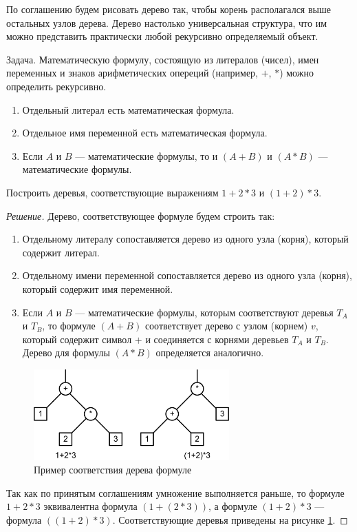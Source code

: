 По соглашению будем рисовать дерево так, чтобы корень располагался выше остальных узлов дерева. Дерево настолько универсальная структура, что им можно представить практически любой рекурсивно определяемый объект.
\begin{exampl} Задача.
    Математическую формулу, состоящую из литералов (чисел), имен переменных и знаков арифметических опереций (например, $+$, $*$) можно определить рекурсивно.
    \begin{enumerate}
        \item Отдельный литерал есть математическая формула.
        \item Отдельное имя переменной есть математическая формула.
        \item Если $A$ и $B$ --- математические формулы, то и $(A+B)$ и $(A*B)$ --- математические формулы.
    \end{enumerate}
    Построить деревья, соответствующие выражениям $1+2*3$ и $(1+2)*3$.
\end{exampl}
\begin{proof}[Решение]
    Дерево, соответствующее формуле будем строить так:
    \begin{enumerate}
        \item Отдельному литералу сопоставляется дерево из одного узла (корня), который содержит литерал.
        \item Отдельному имени переменной сопоставляется дерево из одного узла (корня), который содержит имя переменной.
        \item Если $A$ и $B$ --- математические формулы, которым соответствуют деревья $T_A$ и $T_B$, то
        формуле $(A+B)$ соответствует дерево с узлом (корнем) $v$, который содержит символ $+$ и соединяется с корнями деревьев $T_A$ и $T_B$. Дерево для формулы $(A*B)$ определяется аналогично.
    \end{enumerate}
    
    \begin{figure}
        \centering
        \includegraphics[width=0.67\textwidth]{fig/formulaeTree.png}
        \caption{Пример соответствия дерева формуле}\label{fig:rec:formulaeTree}
    \end{figure}
    
    Так как по принятым соглашениям умножение выполняется раньше, то формуле $1+2*3$ эквивалентна формула $(1+(2*3))$, а формуле $(1+2)*3$ --- формула $((1+2)*3)$. Соответствующие деревья приведены на рисунке \ref{fig:rec:formulaeTree}.
\end{proof}

